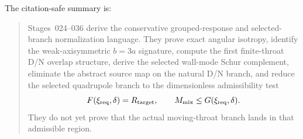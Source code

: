 The citation-safe summary is:
\begin{quote}
Stages~024--036 derive the conservative grouped-response and selected-branch normalization language.  They prove exact angular isotropy, identify the weak-axisymmetric \(b=3a\) signature, compute the first finite-throat D/N overlap structure, derive the selected wall-mode Schur complement, eliminate the abstract source map on the natural D/N branch, and reduce the selected quadrupole branch to the dimensionless admissibility test
\[
F(\xi_{\rm req},\delta)=R_{\rm target},
\qquad
M_{\rm mix}\leq G(\xi_{\rm req},\delta).
\]
They do not yet prove that the actual moving-throat branch lands in that admissible region.
\end{quote}
